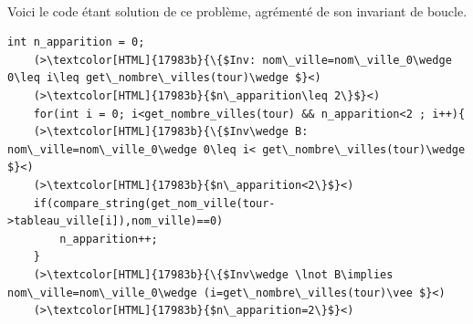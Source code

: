 \documentclass[a4paper, 11pt, oneside]{article}
\begin{document}
\begin{enumerate}
    \\Voici le code étant solution de ce problème, agrémenté de son invariant de boucle.
    \begin{lstlisting}[caption = {code boucle nombre d'apparition d'une ville}]
    int n_apparition = 0;
    (>\textcolor[HTML]{17983b}{\{$Inv: nom\_ville=nom\_ville_0\wedge 0\leq i\leq get\_nombre\_villes(tour)\wedge $}<)
    (>\textcolor[HTML]{17983b}{$n\_apparition\leq 2\}$}<)
    for(int i = 0; i<get_nombre_villes(tour) && n_apparition<2 ; i++){
    (>\textcolor[HTML]{17983b}{\{$Inv\wedge B: nom\_ville=nom\_ville_0\wedge 0\leq i< get\_nombre\_villes(tour)\wedge $}<)
    (>\textcolor[HTML]{17983b}{$n\_apparition<2\}$}<)
    if(compare_string(get_nom_ville(tour->tableau_ville[i]),nom_ville)==0)
        n_apparition++;
    } 
    (>\textcolor[HTML]{17983b}{\{$Inv\wedge \lnot B\implies nom\_ville=nom\_ville_0\wedge (i=get\_nombre\_villes(tour)\vee $}<)
    (>\textcolor[HTML]{17983b}{$n\_apparition=2\}$}<)    
    \end{lstlisting}
\end{enumerate}
\end{document}
